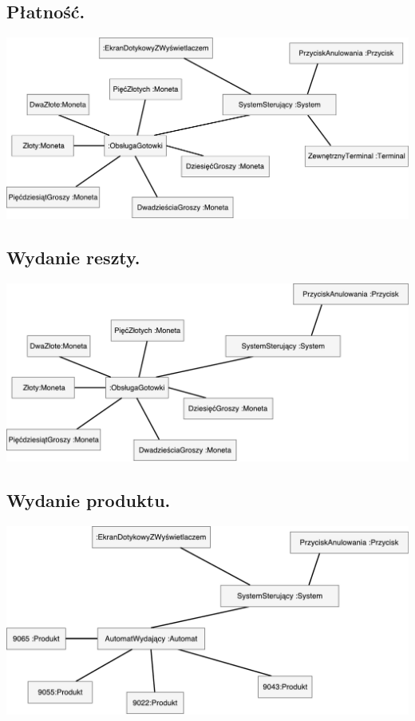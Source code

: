\documentclass[11pt]{article}
\begin{document}
		\subsection{Płatność.}
		\begin{center}
			\includegraphics[scale=0.65]{obiektow2.pdf}
		\end{center}
		\subsection{Wydanie reszty.}
		\begin{center}
			\includegraphics[scale=0.65]{obiektow3.pdf}
		\end{center}
		\newpage
		\subsection{Wydanie produktu.}
		\begin{center}
			\includegraphics[scale=0.65]{obiektow4.pdf}
		\end{center}
\end{document}
